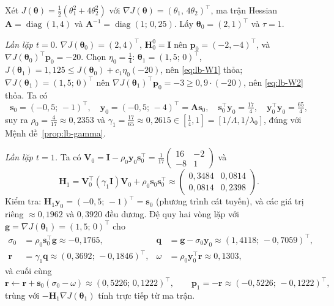 \begin{example}\label{ex:lb-quad}
Xét $J(\boldsymbol{\theta})=\tfrac12(\theta_1^2+4\theta_2^2)$ với $\nabla J(\boldsymbol{\theta})=(\theta_1,\,4\theta_2)^{\top}$, ma trận Hessian $\mathbf{A}=\operatorname{diag}(1,4)$ và $\mathbf{A}^{-1}=\operatorname{diag}(1;\,0{,}25)$. Lấy $\boldsymbol{\theta}_0=(2,1)^{\top}$ và $\tau=1$.

\emph{Lần lặp $t=0$.} $\nabla J(\boldsymbol{\theta}_0)=(2,4)^{\top}$, $\mathbf{H}_0^{0}=\mathbf{I}$ nên $\mathbf{p}_0=(-2,-4)^{\top}$, và $\nabla J(\boldsymbol{\theta}_0)^{\top}\mathbf{p}_0=-20$. Chọn $\eta_0=\tfrac14$: $\boldsymbol{\theta}_1=(1{,}5;\,0)^{\top}$, $J(\boldsymbol{\theta}_1)=1{,}125\le J(\boldsymbol{\theta}_0)+c_1\eta_0(-20)$, nên \eqref{eq:lb-W1} thỏa; $\nabla J(\boldsymbol{\theta}_1)=(1{,}5;\,0)^{\top}$ nên $\nabla J(\boldsymbol{\theta}_1)^{\top}\mathbf{p}_0=-3\ge0{,}9\cdot(-20)$, nên \eqref{eq:lb-W2} thỏa. Ta có
\begin{equation*}
  \mathbf{s}_0=(-0{,}5;\,-1)^{\top},\quad
  \mathbf{y}_0=(-0{,}5;\,-4)^{\top}=\mathbf{A}\mathbf{s}_0,\quad
  \mathbf{s}_0^{\top}\mathbf{y}_0=\tfrac{17}{4},\quad
  \mathbf{y}_0^{\top}\mathbf{y}_0=\tfrac{65}{4},
\end{equation*}
suy ra $\rho_0=\tfrac{4}{17}\approx0{,}2353$ và $\gamma_1=\tfrac{17}{65}\approx0{,}2615\in[\tfrac14,1]=[1/\Lambda,1/\lambda_0]$, đúng với Mệnh đề~\ref{prop:lb-gamma}.

\emph{Lần lặp $t=1$.} Ta có $\mathbf{V}_0=\mathbf{I}-\rho_0\mathbf{y}_0\mathbf{s}_0^{\top}=\tfrac{1}{17}\begin{pmatrix}16&-2\\-8&1\end{pmatrix}$ và
\begin{equation*}
  \mathbf{H}_1=\mathbf{V}_0^{\top}(\gamma_1\mathbf{I})\mathbf{V}_0+\rho_0\mathbf{s}_0\mathbf{s}_0^{\top}\approx\begin{pmatrix}0{,}3484&0{,}0814\\0{,}0814&0{,}2398\end{pmatrix}.
\end{equation*}
Kiểm tra: $\mathbf{H}_1\mathbf{y}_0=(-0{,}5;\,-1)^{\top}=\mathbf{s}_0$ (phương trình cát tuyến), và các giá trị riêng $\approx0{,}1962$ và $0{,}3920$ đều dương. Đệ quy hai vòng lặp với $\mathbf{g}=\nabla J(\boldsymbol{\theta}_1)=(1{,}5;\,0)^{\top}$ cho
\begin{align*}
  \sigma_0&=\rho_0\mathbf{s}_0^{\top}\mathbf{g}\approx-0{,}1765, & \mathbf{q}&=\mathbf{g}-\sigma_0\mathbf{y}_0\approx(1{,}4118;\,-0{,}7059)^{\top},\\
  \mathbf{r}&=\gamma_1\mathbf{q}\approx(0{,}3692;\,-0{,}1846)^{\top}, & \omega&=\rho_0\mathbf{y}_0^{\top}\mathbf{r}\approx0{,}1303,
\end{align*}
và cuối cùng
\begin{equation*}
  \mathbf{r}\leftarrow\mathbf{r}+\mathbf{s}_0(\sigma_0-\omega)\approx(0{,}5226;\,0{,}1222)^{\top},
  \qquad
  \mathbf{p}_1=-\mathbf{r}\approx(-0{,}5226;\,-0{,}1222)^{\top},
\end{equation*}
trùng với $-\mathbf{H}_1\nabla J(\boldsymbol{\theta}_1)$ tính trực tiếp từ ma trận.


\end{example}

